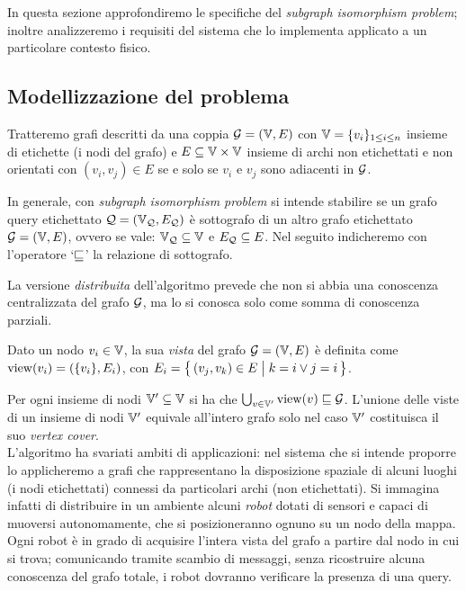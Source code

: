 In questa sezione approfondiremo le specifiche del
\emph{subgraph isomorphism problem}; inoltre analizzeremo i
requisiti del sistema che lo implementa applicato a un particolare
contesto fisico.

\subsection{Modellizzazione del problema}
Tratteremo grafi descritti da una coppia
$\mathcal{G} = (\mathbb{V}, E)$ con $\mathbb{V} = \{ v_i \}_{1 \leq i \leq n}$ insieme di
etichette (i nodi del grafo) e $E \subseteq \mathbb{V} \times \mathbb{V}$
insieme di archi non etichettati e non orientati con
$(v_i, v_j) \in E$ se e solo se $v_i$ e $v_j$ sono adiacenti in $\mathcal{G}$.

In generale, con \emph{subgraph isomorphism problem} si intende
stabilire se un grafo query etichettato $\mathcal{Q} = (\mathbb{V}_{\mathcal{Q}}, E_{\mathcal{Q}})$ è
sottografo di un altro grafo etichettato $\mathcal{G} = ( \mathbb{V}, E)$,
ovvero se vale: $\mathbb{V}_{\mathcal{Q}} \subseteq \mathbb{V}$ e $E_{\mathcal{Q}} \subseteq E$.
Nel seguito indicheremo con l'operatore `$\sqsubseteq$' la relazione
di sottografo.

La versione \emph{distribuita} dell'algoritmo prevede che
non si abbia una conoscenza centralizzata del grafo $\mathcal{G}$,
ma lo si conosca solo come somma di conoscenza parziali.

\begin{definition}
Dato un nodo $v_i \in \mathbb{V}$, la sua \emph{vista} del grafo
$\mathcal{G} = (\mathbb{V}, E)$ è definita come $\mathrm{view}(v_i) = (\{v_i\}, E_i)$, con
$E_i = \bigl\{\,(v_j, v_k) \in E \bigm| k = i \vee j = i \,\bigr\}$.
\end{definition}

Per ogni insieme di nodi $\mathbb{V}' \subseteq \mathbb{V}$ si ha che
$\bigcup_{v \in \mathbb{V}'} \mathrm{view}(v) \sqsubseteq \mathcal{G}$.
L'unione delle viste di un insieme di nodi $\mathbb{V}'$ equivale
all'intero grafo solo nel caso $\mathbb{V}'$ costituisca il suo
\emph{vertex cover}.\\

L'algoritmo ha svariati ambiti di applicazioni: nel sistema che si
intende proporre lo applicheremo a grafi che rappresentano la
disposizione spaziale di alcuni luoghi (i nodi etichettati)
connessi da particolari archi (non etichettati).
Si immagina infatti di distribuire in un ambiente alcuni \emph{robot}
dotati di sensori e capaci di muoversi autonomamente, che si
posizioneranno ognuno su un nodo della mappa.
Ogni robot è in grado di acquisire l'intera vista del grafo a partire
dal nodo in cui si trova;
comunicando tramite scambio di messaggi, senza ricostruire alcuna
conoscenza del grafo totale, i robot dovranno verificare la
presenza di una query.

